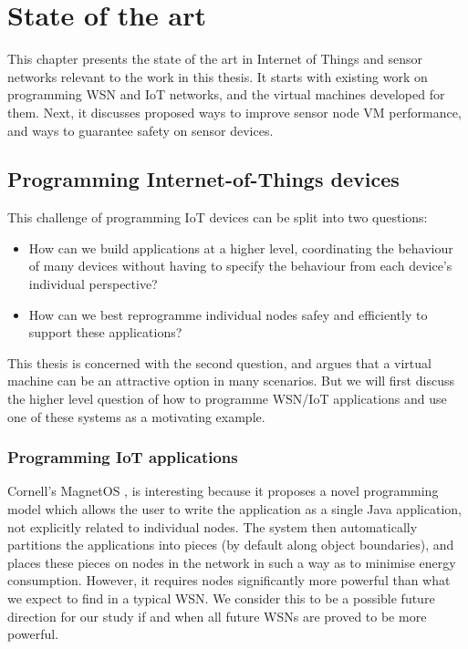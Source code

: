 \chapter{State of the art}
This chapter presents the state of the art in Internet of Things and sensor networks relevant to the work in this thesis. It starts with existing work on programming WSN and IoT networks, and the virtual machines developed for them. Next, it discusses proposed ways to improve sensor node VM performance, and ways to guarantee safety on sensor devices.

\section{Programming Internet-of-Things devices}

This challenge of programming IoT devices can be split into two questions:

\begin{itemize}
	\item How can we build applications at a higher level, coordinating the behaviour of many devices without having to specify the behaviour from each device's individual perspective?
	\item How can we best reprogramme individual nodes safey and efficiently to support these applications?
\end{itemize}

This thesis is concerned with the second question, and argues that a virtual machine can be an attractive option in many scenarios. But we will first discuss the higher level question of how to programme WSN/IoT applications and use one of these systems as a motivating example.

\subsection{Programming IoT applications}



Cornell’s MagnetOS \cite{Liu:2005wsa}, is interesting because it proposes a novel programming model which allows the user to write the application as a single Java application, not explicitly related to individual nodes. The system then automatically partitions the applications into pieces (by default along object boundaries), and places these pieces on nodes in the network in such a way as to minimise energy consumption. However, it requires nodes significantly more powerful than what we expect to find in a typical WSN. We consider this to be a possible future direction for our study if and when all future WSNs are proved to be more powerful.

